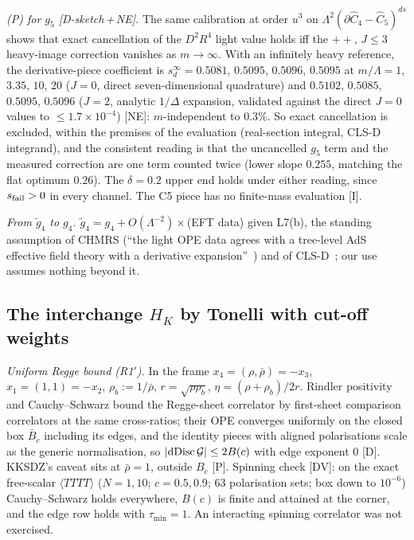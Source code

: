 \documentclass[aps,prl,onecolumn,superscriptaddress,nofootinbib]{revtex4-2}
\begin{document}
\emph{(P) for $g_5$ [D-sketch\,+\,NE].} The same calibration at order $u^3$ on
$\Lambda^2(\partial\hat C_4-\hat C_5)^{ds}$ shows that exact cancellation of the $D^2R^4$ light
value holds iff the $++$, $J\le3$ heavy-image correction vanishes as $m\to\infty$. With an infinitely heavy
reference, the derivative-piece coefficient is $s_d^\infty=0.5081$, $0.5095$, $0.5096$, $0.5095$ at
$m/\Lambda=1$, $3.35$, $10$, $20$ ($J=0$, direct seven-dimensional quadrature) and $0.5102$, $0.5085$,
$0.5095$, $0.5096$ ($J=2$, analytic $1/\Delta$ expansion, validated against the direct $J=0$ values to
$\le1.7\times10^{-4}$) [NE]: $m$-independent to $0.3\%$. So exact cancellation is excluded, within the
premises of the evaluation (real-section integral, CLS-D integrand), and the consistent reading is that the
uncancelled $g_5$ term and the measured correction are one term counted twice (lower slope $0.255$, matching
the flat optimum $0.26$). The $\delta=0.2$ upper end holds under either reading, since $s_{\rm fail}>0$ in every
channel. The C5 piece has no finite-mass evaluation [I].

\emph{From $\tilde g_4$ to $g_4$.} $\tilde g_4=g_4+O(\Lambda^{-2})\times$(EFT data) given L7(b), the
standing assumption of CHMRS (``the light OPE data agrees with a tree-level AdS effective field
theory with a derivative expansion''~\cite{CHMRS}) and of CLS-D~\cite{CLSD}; our use assumes nothing beyond it.

\subsection{The interchange \texorpdfstring{$H_K$}{HK} by Tonelli with cut-off weights}
\label{sec:HK}
\emph{Uniform Regge bound (R1$'$).} In the frame $x_4=(\rho,\bar\rho)=-x_3$, $x_1=(1,1)=-x_2$,
$\rho_b:=1/\bar\rho$, $r=\sqrt{\rho\rho_b}$, $\eta=(\rho+\rho_b)/2r$. Rindler positivity and
Cauchy--Schwarz bound the Regge-sheet correlator by first-sheet comparison correlators at the
same cross-ratios; their OPE converges uniformly on the closed box $\bar B_c$ including its edges,
and the identity pieces with aligned polarisations scale as the generic normalisation, so
$|{\rm dDisc}\,\mathcal G|\le2B(c)$ with edge exponent $0$ [D]. KKSDZ's caveat sits at
$\bar\rho=1$, outside $B_c$ [P]. Spinning check [DV]: on the exact free-scalar $\langle TTTT\rangle$
($N=1,10$; $c=0.5,0.9$; 63 polarisation sets; box down to $10^{-6}$) Cauchy--Schwarz holds everywhere,
$B(c)$ is finite and attained at the corner, and the edge row holds with $\tau_{\min}=1$. An interacting
spinning correlator was not exercised.
\end{document}
